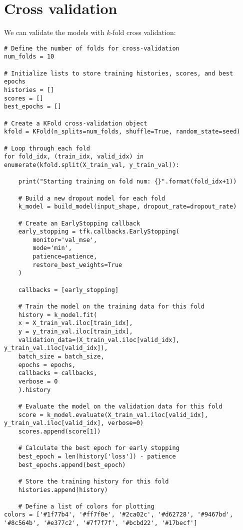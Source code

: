 \section{Cross validation}

We can validate the models with $k$-fold cross validation:
\begin{lstlisting}[style=Python]
# Define the number of folds for cross-validation
num_folds = 10

# Initialize lists to store training histories, scores, and best epochs
histories = []
scores = []
best_epochs = []

# Create a KFold cross-validation object
kfold = KFold(n_splits=num_folds, shuffle=True, random_state=seed)

# Loop through each fold
for fold_idx, (train_idx, valid_idx) in enumerate(kfold.split(X_train_val, y_train_val)):

    print("Starting training on fold num: {}".format(fold_idx+1))

    # Build a new dropout model for each fold
    k_model = build_model(input_shape, dropout_rate=dropout_rate)

    # Create an EarlyStopping callback
    early_stopping = tfk.callbacks.EarlyStopping(
        monitor='val_mse',
        mode='min',
        patience=patience,
        restore_best_weights=True
    )

    callbacks = [early_stopping]

    # Train the model on the training data for this fold
    history = k_model.fit(
    x = X_train_val.iloc[train_idx],
    y = y_train_val.iloc[train_idx],
    validation_data=(X_train_val.iloc[valid_idx], y_train_val.iloc[valid_idx]),
    batch_size = batch_size,
    epochs = epochs,
    callbacks = callbacks,
    verbose = 0
    ).history

    # Evaluate the model on the validation data for this fold
    score = k_model.evaluate(X_train_val.iloc[valid_idx], y_train_val.iloc[valid_idx], verbose=0)
    scores.append(score[1])

    # Calculate the best epoch for early stopping
    best_epoch = len(history['loss']) - patience
    best_epochs.append(best_epoch)

    # Store the training history for this fold
    histories.append(history)

    # Define a list of colors for plotting
colors = ['#1f77b4', '#ff7f0e', '#2ca02c', '#d62728', '#9467bd', '#8c564b', '#e377c2', '#7f7f7f', '#bcbd22', '#17becf']


\end{lstlisting}

